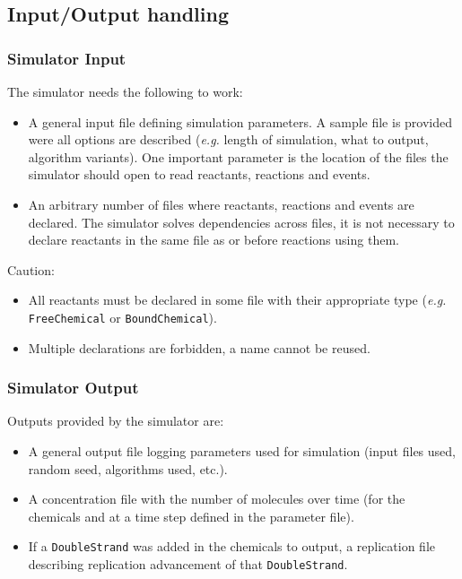 
\subsection{Input/Output handling}

\subsubsection{Simulator Input}

The simulator needs the following to work:
\begin{itemize}
  \item A general input file defining simulation parameters.
  A sample file is provided were all options are described
  (\textit{e.g.} length of simulation, what to output, algorithm variants).
  One important parameter is the location of the files the simulator
  should open to read reactants, reactions and events.
  \item An arbitrary number of files where reactants, reactions and events are declared.
  The simulator solves dependencies across files, it is not necessary
  to declare reactants in the same file as or before reactions using them.
\end{itemize}

Caution:
\begin{itemize}
\item All reactants must be declared in some file with their appropriate type
(\textit{e.g.} \texttt{FreeChemical} or \texttt{BoundChemical}).
\item Multiple declarations are forbidden, a name cannot be reused.
\end{itemize}

\subsubsection{Simulator Output}

Outputs provided by the simulator are:
\begin{itemize}
\item A general output file logging parameters used for simulation (input files used, random seed, algorithms used, etc.).
\item A concentration file with the number of molecules over time (for the chemicals and at a time step defined in the parameter file).
\item If a \texttt{DoubleStrand} was added in the chemicals to output,
a replication file describing replication advancement of that \texttt{DoubleStrand}.
\end{itemize}
